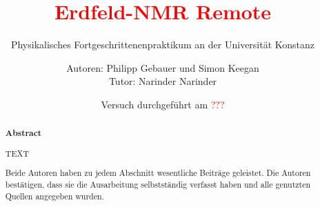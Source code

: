 \title{\textcolor{red}{Erdfeld-NMR Remote}}
\subtitle{Physikalisches Fortgeschrittenenpraktikum an der Universität Konstanz}
\author{Autoren: Philipp Gebauer und Simon Keegan \\ \large{Tutor: Narinder Narinder}}
\date{Versuch durchgeführt am \textcolor{red}{???}}
\maketitle
\begin{abstract}
    \begin{center}
        \Large{\textsf{\textbf{Abstract}}}
    \end{center}
    \vspace{0.75 cm}
    \begin{singlespace}
    \noindent TEXT
    \vspace{0.75 cm}
     
    \noindent Beide Autoren haben zu jedem Abschnitt wesentliche Beiträge geleistet. Die Autoren bestätigen, dass sie die Ausarbeitung selbstständig verfasst haben und alle genutzten Quellen angegeben wurden.

\end{singlespace}
\end{abstract}

\thispagestyle{empty}
\newpage